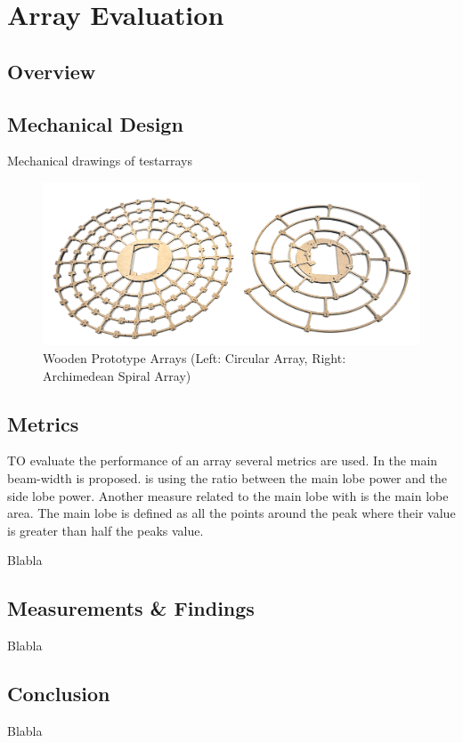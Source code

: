 \chapter{Array Evaluation}
\section{Overview}

\newpage
\section{Mechanical Design}
Mechanical drawings of testarrays

\begin{figure}[h]
	\centering
	\includegraphics[width=1.0\textwidth]{images/5_array_evaluation/wooden_arrays.png}
	\caption{Wooden Prototype Arrays (Left: Circular Array, Right: Archimedean Spiral Array)}
	\label{fig:wooden_arrays}
\end{figure}

\newpage
\section{Metrics}
TO evaluate the performance of an array several metrics are used.
In  the
main beam-width is proposed.
 is using the ratio
between the main lobe power and the side lobe power.
Another measure related to the main lobe with is the main lobe area.
The main lobe is defined as all the points around the peak where their value
is greater than half the peaks value. 

Blabla

\newpage
\section{Measurements \& Findings}
Blabla


\newpage
\section{Conclusion}
Blabla
